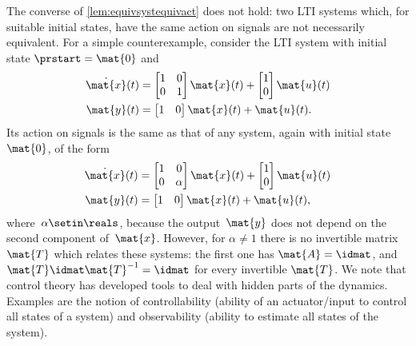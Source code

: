 \begin{remark}
    \label{rem:same-action-not-equivalent}
    The converse of \cref{lem:equivsystequivact} does not hold: two LTI systems which, for suitable initial states, have the same action on signals are not necessarily equivalent.
    For a simple counterexample, consider the LTI system with initial state $\prstart = \mat{0}$ and
    \begin{equation}
        \begin{aligned}
            \dot{\mat{x}}(t) & =\begin{bmatrix}
                                    1 & 0 \\ 0& 1
                                \end{bmatrix} \mat{x}(t)+\begin{bmatrix}
                                                             1 \\ 0
                                                         \end{bmatrix} \mat{u}(t) \\
            \mat{y}(t)       & =\begin{bmatrix}
                                    1 & 0
                                \end{bmatrix} \mat{x}(t)+\mat{u}(t).
        \end{aligned}
    \end{equation}
    Its action on signals is the same as that of any system, again with initial state $\mat{0}$, of the form
    \begin{equation}
        \begin{aligned}
            \dot{\mat{x}}(t) & =\begin{bmatrix}
                                    1 & 0 \\ 0& \alpha
                                \end{bmatrix} \mat{x}(t)+\begin{bmatrix}
                                                             1 \\ 0
                                                         \end{bmatrix} \mat{u}(t) \\
            \mat{y}(t)       & =\begin{bmatrix}
                                    1 & 0
                                \end{bmatrix} \mat{x}(t)+\mat{u}(t),
        \end{aligned}
    \end{equation}
    where~$\alpha \setin \reals$, because the output~$\mat{y}$ does not depend on the second component of~$\mat{x}$.
    However, for $\alpha \neq 1$ there is no invertible matrix $\mat{T}$ which relates these systems: the first one has $\mat{A} = \idmat$, and $\mat{T}\idmat\mat{T}^{-1} = \idmat$ for every invertible $\mat{T}$.
    We note that control theory has developed tools to deal with hidden parts of the dynamics.
    Examples are the notion of controllability (ability of an actuator/input to control all states of a system) and observability (ability to estimate all states of the system).
\end{remark}

